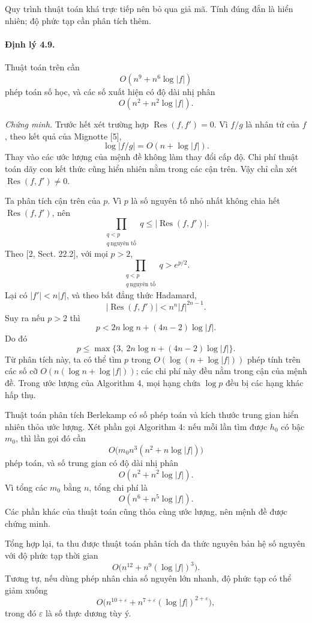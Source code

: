 \documentclass[11pt]{article}
\begin{document}
Quy trình thuật toán khá trực tiếp nên bỏ qua giả mã. Tính đúng đắn là hiển
nhiên; độ phức tạp cần phân tích thêm.

\paragraph{Định lý 4.9.}
Thuật toán trên cần
\[
  O(n^9+n^6\log |f|)
\]
phép toán số học, và các số xuất hiện có độ dài nhị phân
\[
  O(n^2+n^2\log |f|).
\]

\emph{Chứng minh.}
Trước hết xét trường hợp \(\operatorname{Res}(f,f')=0\). Vì \(f/g\) là nhân tử
của \(f\), theo kết quả của Mignotte [5],
\[
  \log |f/g|=O(n+\log |f|).
\]
Thay vào các ước lượng của mệnh đề không làm thay đổi cấp độ. Chi phí thuật
toán dãy con kết thức cũng hiển nhiên nằm trong các cận trên. Vậy chỉ cần xét
\(\operatorname{Res}(f,f')\ne0\).

Ta phân tích cận trên của \(p\). Vì \(p\) là số nguyên tố nhỏ nhất không chia
hết \(\operatorname{Res}(f,f')\), nên
\[
  \prod_{\substack{q<p\\ q\ \text{nguyên tố}}}q
  \le |\operatorname{Res}(f,f')|.
\]
Theo [2, Sect. 22.2], với mọi \(p>2\),
\[
  \prod_{\substack{q<p\\ q\ \text{nguyên tố}}}q>e^{p/2}.
\]
Lại có \(|f'|<n|f|\), và theo bất đẳng thức Hadamard,
\[
  |\operatorname{Res}(f,f')|<n^n|f|^{2n-1}.
\]
Suy ra nếu \(p>2\) thì
\[
  p<2n\log n+(4n-2)\log |f|.
\]
Do đó
\[
  p\le \max\{3,\ 2n\log n+(4n-2)\log |f|\}.
\]
Từ phân tích này, ta có thể tìm \(p\) trong \(O(\log(n+\log |f|))\) phép tính
trên các số cỡ \(O(n(\log n+\log |f|))\); các chi phí này đều nằm trong cận
của mệnh đề. Trong ước lượng của Algorithm 4, mọi hạng chứa \(\log p\) đều bị
các hạng khác hấp thụ.

Thuật toán phân tích Berlekamp có số phép toán và kích thước trung gian hiển
nhiên thỏa ước lượng. Xét phần gọi Algorithm 4: nếu mỗi lần tìm được \(h_0\)
có bậc \(m_0\), thì lần gọi đó cần
\[
  O\bigl(m_0n^3(n^2+n\log |f|)\bigr)
\]
phép toán, và số trung gian có độ dài nhị phân
\[
  O(n^2+n^2\log |f|).
\]
Vì tổng các \(m_0\) bằng \(n\), tổng chi phí là
\[
  O(n^6+n^5\log |f|).
\]
Các phần khác của thuật toán cũng thỏa cùng ước lượng, nên mệnh đề được chứng
minh.

Tổng hợp lại, ta thu được thuật toán phân tích đa thức nguyên bản hệ số nguyên
với độ phức tạp thời gian
\[
  O\bigl(n^{12}+n^9(\log |f|)^3\bigr).
\]
Tương tự, nếu dùng phép nhân chia số nguyên lớn nhanh, độ phức tạp có thể giảm
xuống
\[
  O\bigl(n^{10+\varepsilon}+n^{7+\varepsilon}(\log |f|)^{2+\varepsilon}\bigr),
\]
trong đó \(\varepsilon\) là số thực dương tùy ý.
\end{document}
